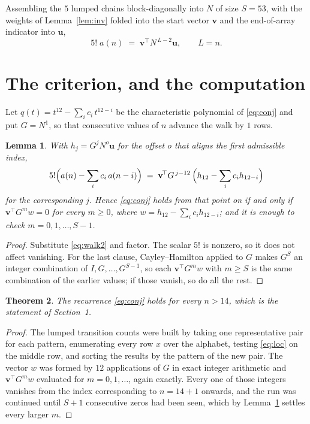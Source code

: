 \documentclass[11pt,a4paper]{article}
\theoremstyle{plain}
\newtheorem{theorem}{Theorem}
\newtheorem{lemma}[theorem]{Lemma}
\theoremstyle{definition}
\begin{document}
Assembling the $5$ lumped chains block-diagonally into $N$ of size $S=53$, with the
weights of Lemma~\ref{lem:inv} folded into the start vector $\mathbf{v}$ and the
end-of-array indicator into $\mathbf{u}$,
\begin{equation}\label{eq:walk2}
5!\;a(n)\;=\;\mathbf{v}^{\!\top}N^{\,L-2}\mathbf{u},\qquad L=n .
\end{equation}

\section{The criterion, and the computation}

Let $q(t)=t^{12}-\sum_i c_i\,t^{12-i}$ be the characteristic polynomial of
\eqref{eq:conj} and put $G=N^{1}$, so that consecutive values of $n$ advance the
walk by $1$ rows.

\begin{lemma}\label{lem:crit}
With $h_j=G^{j}N^{o}\mathbf{u}$ for the offset $o$ that aligns the first admissible
index,
\[
5!\Bigl(a(n)-\sum_i c_i\,a(n-i)\Bigr)\;=\;\mathbf{v}^{\!\top}G^{\,j-12}\,
\Bigl(h_{12}-\sum_i c_i h_{12-i}\Bigr)
\]
for the corresponding $j$. Hence \eqref{eq:conj} holds from that point on if and only if
$\mathbf{v}^{\!\top}G^{m}w=0$ for every $m\ge0$, where
$w=h_{12}-\sum_i c_ih_{12-i}$; and it is enough to check $m=0,1,\dots,S-1$.
\end{lemma}

\begin{proof}
Substitute \eqref{eq:walk2} and factor. The scalar $5!$ is nonzero, so it does not
affect vanishing. For the last clause, Cayley--Hamilton applied to $G$ makes $G^{S}$ an
integer combination of $I,G,\dots,G^{S-1}$, so each $\mathbf{v}^{\!\top}G^{m}w$ with
$m\ge S$ is the same combination of the earlier values; if those vanish, so do all the rest.
\end{proof}

\begin{theorem}
The recurrence \eqref{eq:conj} holds for every $n>14$, which is the statement of
Section~1.
\end{theorem}

\begin{proof}
The lumped transition counts were built by taking one representative pair for each pattern,
enumerating every row $x$ over the alphabet, testing \eqref{eq:loc} on the middle
row, and sorting the results by the pattern of the new pair. The vector $w$ was formed by
$12$ applications of $G$ in exact integer arithmetic and $\mathbf{v}^{\!\top}G^{m}w$
evaluated for $m=0,1,\dots$, again exactly. Every one of those integers vanishes from the
index corresponding to $n=14+1$ onwards, and the run was continued until $S+1$
consecutive zeros had been seen, which by Lemma~\ref{lem:crit} settles every larger $m$.
\end{proof}
\end{document}
